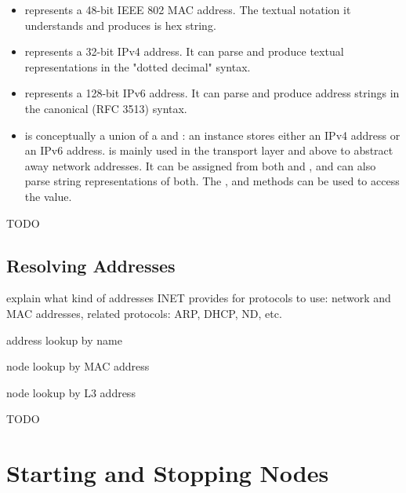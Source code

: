 \begin{itemize}
  \item {} represents a 48-bit IEEE 802 MAC address. The
    textual notation it understands and produces is hex string.

  \item {} represents a 32-bit IPv4 address. It can parse
    and produce textual representations in the "dotted decimal" syntax.

  \item {} represents a 128-bit IPv6 address. It can parse
    and produce address strings in the canonical (RFC 3513) syntax.

  \item {} is conceptually a union of a 
    and : an instance stores either an IPv4 address or an
    IPv6 address.  is mainly used in the transport layer and above
    to abstract away network addresses. It can be assigned from both 
    and , and can also parse string representations of both.
    The ,  and  methods can be used
    to access the value.
\end{itemize}

 TODO
\subsection{Resolving Addresses}

explain what kind of addresses INET provides for protocols to use: network
and MAC addresses, related protocols: ARP, DHCP, ND, etc.

address lookup by name

node lookup by MAC address

node lookup by L3 address


 TODO
\section{Starting and Stopping Nodes}



